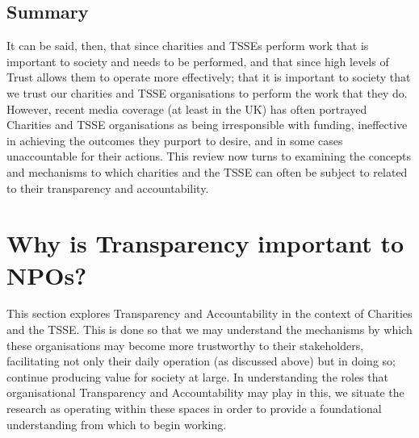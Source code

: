 \subsection{Summary}
It can be said, then, that since charities and TSSEs perform work that is important to society and needs to be performed, and that since high levels of Trust allows them to operate more effectively; that it is important to society that we trust our charities and TSSE organisations to perform the work that they do. However, recent media coverage (at least in the UK) has often portrayed Charities and TSSE organisations as being irresponsible with funding, ineffective in achieving the outcomes they purport to desire, and in some cases unaccountable for their actions. This review now turns to examining the concepts and mechanisms to which charities and the TSSE can often be subject to related to their transparency and accountability.

\section{Why is Transparency important to NPOs?}

This section explores Transparency and Accountability in the context of Charities and the TSSE. This is done so that we may understand the mechanisms by which these organisations may become more trustworthy to their stakeholders, facilitating not only their daily operation (as discussed above) but in doing so; continue producing value for society at large. In understanding the roles that organisational Transparency and Accountability may play in this, we situate the research as operating within these spaces in order to provide a foundational understanding from which to begin working.

